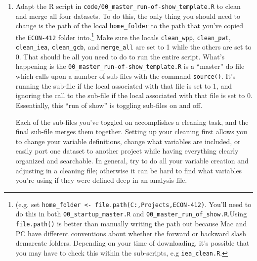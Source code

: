 \begin{enumerate}
\item Adapt the R script in \verb+code/00_master_run-of-show_template.R+ to clean and merge all four datasets. To do this, the only thing you should need to change is the path of the local \verb+home_folder+ to the path that you've copied the \verb+ECON-412+ folder into.\footnote{ (e.g. set  \texttt{home\_folder <- file.path(C:,Projects,ECON-412)}. You'll need to do this in both \texttt{00\_startup\_master.R} and \texttt{00\_master\_run\_of\_show.R}.Using \texttt{file.path()} is better than manually writing the path out because Mac and PC have different conventions about whether the forward or backward slash demarcate folders. Depending on your time of downloading, it's possible that you may have to check this within the sub-scripts, e.g \texttt{iea_clean.R}.}
Make sure the locals  \verb+clean_wpp+, \verb+clean_pwt+, \verb+clean_iea+, \verb+clean_gcb+, and \verb+merge_all+ are set to 1 while the others are set to 0. That should be all you need to do to run the entire script. What's happening is the \verb+00_master_run-of-show_template.R+ is a ``master'' do file which calls upon a number of sub-files with the command \verb+source()+. It's running the sub-file if the local associated with that file is set to 1, and ignoring the call to the sub-file if the local associated with that file is set to 0. Essentially, this ``run of show'' is toggling sub-files on and off.

Each of the sub-files you've toggled on accomplishes a cleaning task, and the final sub-file merges them together. Setting up your cleaning first allows you to change your variable definitions, change what variables are included, or easily port one dataset to another project while having everything clearly organized and searchable. In general, try to do all your variable creation and adjusting in a cleaning file; otherwise it can be hard to find what variables you're using if they were defined deep in an analysis file.


\end{enumerate}
